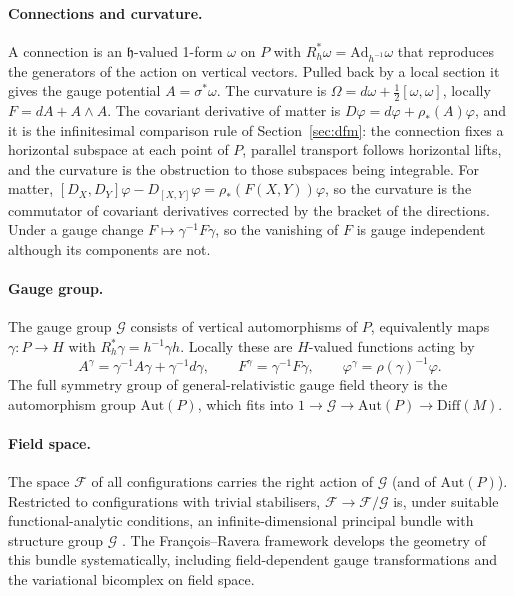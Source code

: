 \documentclass[11pt]{article}
\theoremstyle{plain}
\theoremstyle{definition}
\theoremstyle{remark}
\newcommand{\F}{\mathcal F}
\newcommand{\G}{\mathcal G}
\newcommand{\Diff}{\mathrm{Diff}}
\begin{document}
\paragraph{Connections and curvature.} A connection is an $\mathfrak h$-valued 1-form $\omega$ on $P$ with $R_h^*\omega=\mathrm{Ad}_{h^{-1}}\omega$ that reproduces the generators of the action on vertical vectors. Pulled back by a local section it gives the gauge potential $A=\sigma^*\omega$. The curvature is $\Omega=d\omega+\tfrac12[\omega,\omega]$, locally $F=dA+A\wedge A$. The covariant derivative of matter is $D\varphi=d\varphi+\rho_*(A)\varphi$, and it is the infinitesimal comparison rule of Section~\ref{sec:dfm}: the connection fixes a horizontal subspace at each point of $P$, parallel transport follows horizontal lifts, and the curvature is the obstruction to those subspaces being integrable. For matter, $[D_X,D_Y]\varphi-D_{[X,Y]}\varphi=\rho_*(F(X,Y))\varphi$, so the curvature is the commutator of covariant derivatives corrected by the bracket of the directions. Under a gauge change $F\mapsto\gamma^{-1}F\gamma$, so the vanishing of $F$ is gauge independent although its components are not.

\paragraph{Gauge group.} The gauge group $\G$ consists of vertical automorphisms of $P$, equivalently maps $\gamma:P\to H$ with $R_h^*\gamma=h^{-1}\gamma h$. Locally these are $H$-valued functions acting by
\begin{equation}
A^\gamma=\gamma^{-1}A\gamma+\gamma^{-1}d\gamma,\qquad F^\gamma=\gamma^{-1}F\gamma,\qquad\varphi^\gamma=\rho(\gamma)^{-1}\varphi .
\end{equation}
The full symmetry group of general-relativistic gauge field theory is the automorphism group $\mathrm{Aut}(P)$, which fits into $1\to\G\to\mathrm{Aut}(P)\to\Diff(M)$.

\paragraph{Field space.} The space $\F$ of all configurations carries the right action of $\G$ (and of $\mathrm{Aut}(P)$). Restricted to configurations with trivial stabilisers, $\F\to\F/\G$ is, under suitable functional-analytic conditions, an infinite-dimensional principal bundle with structure group $\G$ \cite{singer,fr-grf}. The François--Ravera framework develops the geometry of this bundle systematically, including field-dependent gauge transformations and the variational bicomplex on field space.
\end{document}
